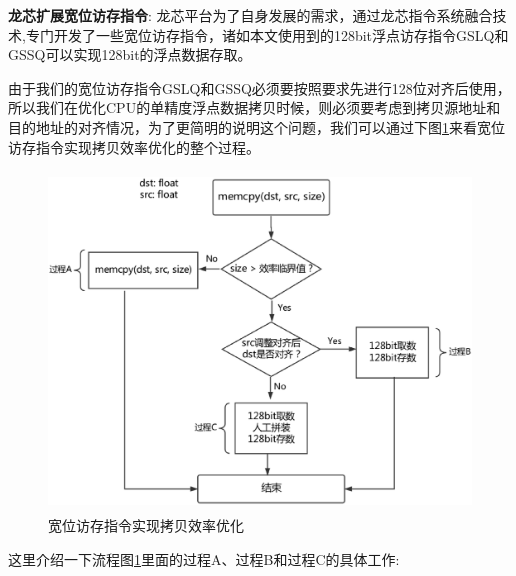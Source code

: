 \textbf{龙芯扩展宽位访存指令}: 龙芯平台为了自身发展的需求，通过龙芯指令系统融合技术\cite{loongson-merge},专门开发了一些宽位访存指令，诸如本文使用到的128bit浮点访存指令GSLQ和GSSQ可以实现128bit的浮点数据存取。

由于我们的宽位访存指令GSLQ和GSSQ必须要按照要求先进行128位对齐后使用，所以我们在优化CPU的单精度浮点数据拷贝时候，则必须要考虑到拷贝源地址和目的地址的对齐情况，为了更简明的说明这个问题，我们可以通过下图\ref{fig:memcpy}来看宽位访存指令实现拷贝效率优化的整个过程。

\begin{figure}[H] 
  \centering
  \includegraphics[width=16cm,height=9cm]{figures/chap03/memcpy}
  \caption{宽位访存指令实现拷贝效率优化}
  \label{fig:memcpy}
\end{figure}

这里介绍一下流程图\ref{fig:memcpy}里面的过程A、过程B和过程C的具体工作:

